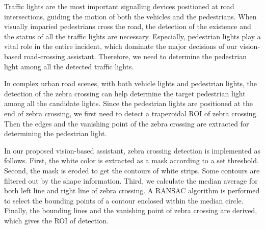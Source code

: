 Traffic lights are the most important signalling devices positioned at road intersections, guiding the motion of both the vehicles and the pedestrians. When visually imparied pedestrians cross the road, the detection of the existence and the status of all the traffic lights are necessary. Especially, pedestrian lights play a vital role in the entire incident, which dominate the major decisions of our vision-based road-crossing assistant. Therefore, we need to determine the pedestrian light among all the detected traffic lights.



 In complex urban road scenes, with both vehicle lights and pedestrian lights, the detection of the zebra crossing can help determine the target pedestrian light among all the candidate lights. Since the pedestrian lights are positioned at the end of zebra crossing, we first need to detect a trapezoidal ROI of zebra crossing. Then the edges and the vanishing point of the zebra crossing are extracted for determining the pedestrian light. 


In our proposed vision-based assistant, zebra crossing detection is implemented as follows. First, the white color is extracted as a mask according to a set threshold. Second, the mask is eroded to get the contours of white strips. Some contours are filtered out by the shape information. Third, we calculate the median average for both left line and right line of zebra crossing. A RANSAC algorithm is performed to select the bounding points of a contour enclosed within the median circle. Finally, the bounding lines and the vanishing point of zebra crossing are derived, which gives the ROI of detection.

